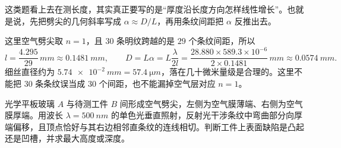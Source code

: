 \begin{solution}
这类题看上去在测长度，其实真正要写的是“厚度沿长度方向怎样线性增长”。也就是说，先把劈尖的几何斜率写成 \(\alpha\approx D/L\)，再用条纹间距把 \(\alpha\) 反推出去。

这里空气劈尖取 \(n=1\)，且 \(30\) 条明纹跨越的是 \(29\) 个条纹间距，所以
\[
l=\frac{4.295}{29}\,\si{mm}\approx \SI{0.1481}{mm},\qquad
D=L\alpha=L\frac{\lambda}{2l}
=\frac{28.880\times 589.3\times10^{-6}}{2\times0.1481}\,\si{mm}
\approx \SI{0.0574}{mm}.
\]
细丝直径约为 \(\SI{5.74e-2}{mm}=\SI{57.4}{\micro m}\)，落在几十微米量级是合理的。这里不能把 \(30\) 条条纹误当成 \(30\) 个间距，也不能漏掉空气层对应 \(n=1\)。
\end{solution}

\begin{exercise}[空气劈尖条纹弯向厚端时怎样判断凸凹缺陷]
光学平板玻璃 \(A\) 与待测工件 \(B\) 间形成空气劈尖，左侧为空气膜薄端、右侧为空气膜厚端。用波长 \(\lambda=\SI{500}{nm}\) 的单色光垂直照射，反射光干涉条纹中弯曲部分向厚端偏移，且顶点恰好与其右边相邻直条纹的连线相切。判断工件上表面缺陷是凸起还是凹槽，并求最大高度或深度。
\end{exercise}
